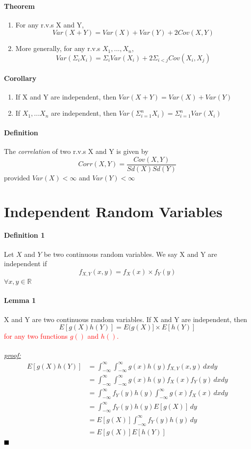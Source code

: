 \documentclass[11pt]{article}
\newcommand{\ti}[1]{\textit{#1}}
\newcommand{\proof}[0]{\textit{\underline{proof: }}}
\newcommand{\qed}[0]{$\hfill\blacksquare$}
\begin{document}
\paragraph{Theorem} 
\begin{enumerate}
\item For any r.v.s X and Y,
$$Var(X+Y) = Var(X) + Var(Y) + 2Cov(X,Y)$$
\item More generally, for any r.v.s $X_1,...,X_n$,$$Var(\Sigma_i X_i) = \Sigma_i Var(X_i) + 2\Sigma_{i < j}Cov(X_i,X_j)$$
\end{enumerate}
\paragraph{Corollary}
\begin{enumerate}
	\item If X and Y are independent, then $Var(X+Y) = Var(X) + Var(Y)$
	\item If $X_1,...X_n$ are independent, then $Var(\Sigma_{i=1}^n X_i) = \Sigma_{i=1}^nVar(X_i)$
\end{enumerate}
\paragraph{Definition} The \ti{correlation} of two r.v.s X and Y is given by
$$Corr(X,Y) = \frac{Cov(X,Y)}{Sd(X)Sd(Y)}$$ 
provided $Var(X) < \infty$ and $Var(Y) < \infty$
\section{Independent Random Variables}
\paragraph{Definition 1} Let $X$ and $Y$ be two continuous random variables. We say X and Y are independent if
$$f_{X,Y}(x,y) = f_X(x) \times f_Y(y)$$
$\forall x,y \in \mathbb{R}$
\paragraph{Lemma 1} X and Y are two continuous random variables. If X and Y are independent, then
$$E[g(X)h(Y)] = E(g(X)] \times E[h(Y)]$$
\textcolor{red}{for any two functions $g()$ and $h()$.} \\\\
\proof\\
\begin{align*}
	E[g(X)h(Y)] &= \int_{-\infty}^\infty \int_{-\infty}^\infty g(x)h(y)f_{X,Y}(x,y)\,dxdy\\
	&= \int_{-\infty}^\infty \int_{-\infty}^\infty g(x)h(y)f_X(x)f_Y(y)\,dxdy\\
	&= \int_{-\infty}^\infty f_Y(y)h(y)\int_{-\infty}^\infty g(x)f_X(x)\,dxdy\\
	&= \int_{-\infty}^\infty f_Y(y)h(y)E[g(X)]\,dy\\
	&= E[g(X)]\int_{-\infty}^\infty f_Y(y)h(y)\,dy\\
	&= E[g(X)]E[h(Y)]
\end{align*}
\qed
\end{document}

